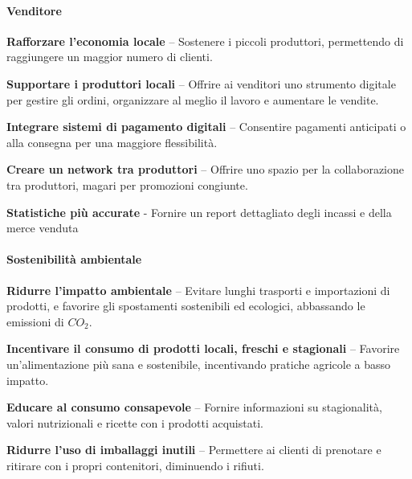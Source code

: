 \paragraph{Venditore}
\begin{objitem}
    \item  \textbf{Rafforzare l'economia locale} – Sostenere i piccoli produttori, permettendo di raggiungere un maggior numero di clienti.
    \item  \textbf{Supportare i produttori locali} – Offrire ai venditori uno strumento digitale per gestire gli ordini, organizzare al meglio il lavoro e aumentare le vendite.
    \item  \textbf{Integrare sistemi di pagamento digitali} – Consentire pagamenti anticipati o alla consegna per una maggiore flessibilità.
    \item  \textbf{Creare un network tra produttori} – Offrire uno spazio per la collaborazione tra produttori, magari per promozioni congiunte.
    \item \textbf{Statistiche più accurate} - Fornire un report dettagliato degli incassi e della merce venduta
\end{objitem}


\paragraph{Sostenibilità ambientale}    
\begin{objitem}
    \item  \textbf{Ridurre l'impatto ambientale} – Evitare lunghi trasporti e importazioni di prodotti, e favorire gli spostamenti sostenibili ed ecologici, abbassando le emissioni di $CO_2$.
    \item  \textbf{Incentivare il consumo di prodotti locali, freschi e stagionali} – Favorire un'alimentazione più sana e sostenibile, incentivando pratiche agricole a basso impatto.
    \item  \textbf{Educare al consumo consapevole} – Fornire informazioni su stagionalità, valori nutrizionali e ricette con i prodotti acquistati.
    \item  \textbf{Ridurre l'uso di imballaggi inutili} – Permettere ai clienti di prenotare e ritirare con i propri contenitori, diminuendo i rifiuti.
\end{objitem}


